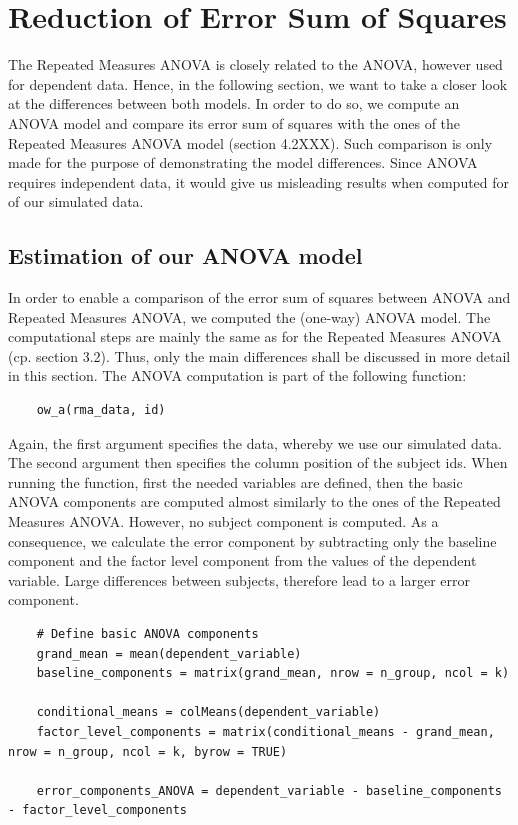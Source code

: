 \documentclass[11pt]{article}
\begin{document}
	
	
	
	
	
	\section{Reduction of Error Sum of Squares}
	The Repeated Measures ANOVA is closely related to the ANOVA, however used for dependent data. Hence, in the following section, we want to take a closer look at the differences between both models. In order to do so, we compute an ANOVA model and compare its error sum of squares with the ones of the Repeated Measures ANOVA model (section 4.2XXX).	Such comparison is only made for the purpose of demonstrating the model differences. Since ANOVA requires independent data, it would give us misleading results when computed for of our simulated data.\\
	
	
	
	\subsection{Estimation of our ANOVA model}
	In order to enable a comparison of the error sum of squares between ANOVA and Repeated Measures ANOVA, we computed the (one-way) ANOVA model. The computational steps are mainly the same as for the Repeated Measures ANOVA (cp. section 3.2). Thus, only the main differences shall be discussed in more detail in this section. The ANOVA computation is part of the following function:\\
	
	\begin{lstlisting}
	ow_a(rma_data, id)
	\end{lstlisting}
	
	Again, the first argument specifies the data, whereby we use our simulated data. The second argument then specifies the column position of the subject ids. When running the function, first the needed variables are defined, then the basic ANOVA components are computed almost similarly to the ones of the Repeated Measures ANOVA. However, no subject component is computed. As a consequence, we calculate the error component by subtracting only the baseline component and the factor level component from the values of the dependent variable. Large differences between subjects, therefore lead to a larger error component.\\
	
	\begin{lstlisting}
	# Define basic ANOVA components
	grand_mean = mean(dependent_variable)
	baseline_components = matrix(grand_mean, nrow = n_group, ncol = k)
	
	conditional_means = colMeans(dependent_variable)
	factor_level_components = matrix(conditional_means - grand_mean, nrow = n_group, ncol = k, byrow = TRUE)
	
	error_components_ANOVA = dependent_variable - baseline_components - factor_level_components
	\end{lstlisting}       
	
\end{document}
